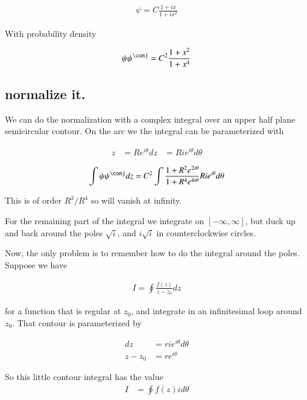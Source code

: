\documentclass{article}
\begin{document}
\begin{align*}
\psi = C \frac{1 + ix}{1 + ix^2}
\end{align*}

With probability density

\begin{align*}
\psi\psi^\conj = C^2 \frac{1 + x^2}{1 + x^4}
\end{align*}

\subsection{ normalize it. }

We can do the normalization with a complex integral over an upper half plane
semicircular contour.  On the arc we the integral can be parameterized with

\begin{align*}
z &= R e^{i\theta}
dz &= R i e^{i\theta} d\theta
\end{align*}

\begin{align*}
\int \psi\psi^\conj dz = C^2 \int \frac{1 + R^2 e^{2i\theta}}{1 + R^4 e^{4i\theta}} R i e^{i\theta} d\theta
\end{align*}

This is of order $R^3/R^4$ so will vanish at infinity.

For the remaining part of the integral we integrate on $[-\infty,\infty]$, but duck up and back around the poles 
$\sqrt{i}$, and $i \sqrt{i}$ in counterclockwise circles.

Now, the only problem is to remember how to do the integral around the poles.  Suppose we have

\begin{align*}
I = \oint \frac{f(z)}{z -z_0} dz
\end{align*}

for a function that is regular at $z_0$, and integrate in an infinitesimal loop around $z_0$.  That contour is parameterized by

\begin{align*}
dz &= r i e^{i\theta} d\theta \\
z - z_0 &= r e^{i\theta}
\end{align*}

So this little contour integral has the value
\begin{align*}
I &= \oint f(z) i d\theta \\
\end{align*}
\end{document}
